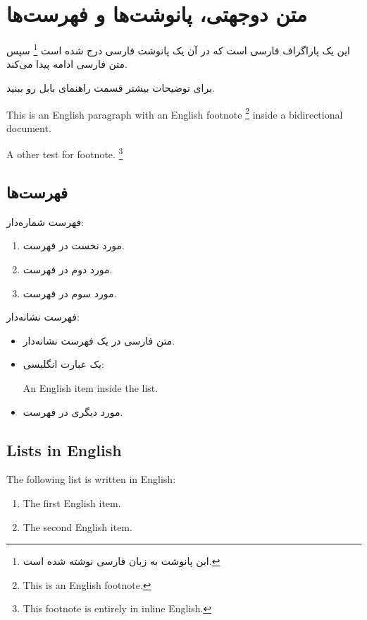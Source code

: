 \documentclass{article}
\begin{document}
    \section{متن دوجهتی، پانوشت‌ها و فهرست‌ها}

    این یک پاراگراف فارسی است که در آن یک پانوشت فارسی درج شده است%
    \footnote{این پانوشت به زبان فارسی نوشته شده است.} سپس متن فارسی ادامه
    پیدا می‌کند.


برای توضیحات بیشتر قسمت
راهنمای بابل رو ببنید.

       \begin{latin}
        This is an English paragraph with an English footnote%
        \footnote{This is an English footnote.}
        inside a bidirectional document.
    \end{latin}


      \hfill \foreignlanguage{english}{ A other test for footnote.
        \footnote{%
            This footnote is entirely in inline English.
        }
    }

    \subsection{فهرست‌ها}

    فهرست شماره‌دار:

    \begin{enumerate}
        \item مورد نخست در فهرست.
        \item مورد دوم در فهرست.
        \item مورد سوم در فهرست.
    \end{enumerate}

    فهرست نشانه‌دار:

    \begin{itemize}
        \item متن فارسی در یک فهرست نشانه‌دار.
        \item یک عبارت انگلیسی:
        \begin{otherlanguage}{english}
            An English item inside the list.
        \end{otherlanguage}
        \item مورد دیگری در فهرست.
    \end{itemize}

    \begin{otherlanguage}{english}
        \subsection{Lists in English}

        The following list is written in English:

        \begin{enumerate}
            \item The first English item.
            \item The second English item.
        \end{enumerate}
    \end{otherlanguage}
\end{document}
